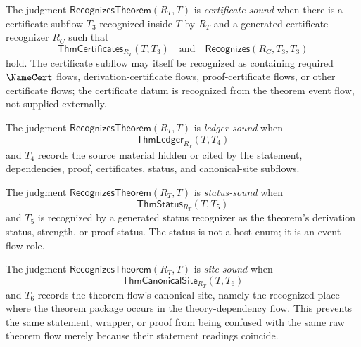 \begin{definition}
\label{def:theorem-generated-certificate-sound}
The judgment $\mathsf{RecognizesTheorem}(R_T,T)$ is \emph{certificate-sound} when there is a certificate subflow $T_3$ recognized inside $T$ by $R_T$ and a generated certificate recognizer $R_C$ such that
$$
  \mathsf{ThmCertificates}_{R_T}(T,T_3)
  \quad\text{and}\quad
  \mathsf{Recognizes}(R_C,T_3,T_3)
$$
hold. The certificate subflow may itself be recognized as containing required $\NameCert$ flows, derivation-certificate flows, proof-certificate flows, or other certificate flows; the certificate datum is recognized from the theorem event flow, not supplied externally.
\end{definition}

\begin{definition}
\label{def:theorem-generated-ledger-sound}
The judgment $\mathsf{RecognizesTheorem}(R_T,T)$ is \emph{ledger-sound} when
$$
  \mathsf{ThmLedger}_{R_T}(T,T_4)
$$
and $T_4$ records the source material hidden or cited by the statement, dependencies, proof, certificates, status, and canonical-site subflows.
\end{definition}

\begin{definition}
\label{def:theorem-generated-status-sound}
The judgment $\mathsf{RecognizesTheorem}(R_T,T)$ is \emph{status-sound} when
$$
  \mathsf{ThmStatus}_{R_T}(T,T_5)
$$
and $T_5$ is recognized by a generated status recognizer as the theorem's derivation status, strength, or proof status. The status is not a host enum; it is an event-flow role.
\end{definition}

\begin{definition}
\label{def:theorem-generated-site-sound}
The judgment $\mathsf{RecognizesTheorem}(R_T,T)$ is \emph{site-sound} when
$$
  \mathsf{ThmCanonicalSite}_{R_T}(T,T_6)
$$
and $T_6$ records the theorem flow's canonical site, namely the recognized place where the theorem package occurs in the theory-dependency flow. This prevents the same statement, wrapper, or proof from being confused with the same raw theorem flow merely because their statement readings coincide.
\end{definition}

